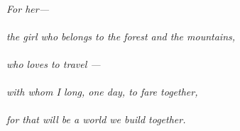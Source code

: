 
\begin{abstract}

\end{abstract}
\clearpage

\thispagestyle{empty}
\null\vfill
\begin{center}
\begin{minipage}{0.74\linewidth}
\centering\itshape\color{rose}
\\[0.3em]
For her---\\[0.7em]
\upshape {}\\[0.2em]
the girl who belongs to the forest and the mountains,\\[0.5em]
\\[0.2em]
who loves to travel —\\[0.5em]
\\[0.2em]
with whom I long, one day, to fare together,\\[0.2em]
\\[0.2em]
for that will be a world we build together.
\end{minipage}
\end{center}
\vfill\null
\clearpage


















